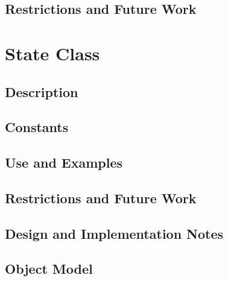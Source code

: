 \documentclass[english]{article}
\begin{document}
\subsection{Restrictions and Future Work}

%
\section{State Class}
\subsection{Description}

\subsection{Constants}

\subsection{Use and Examples}




\subsection{Restrictions and Future Work}

\subsection{Design and Implementation Notes}

\newpage
\subsection{Object Model}

\end{document}
